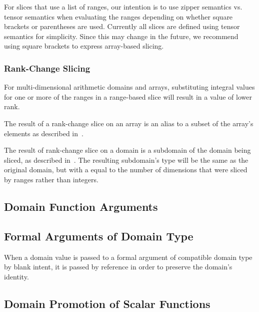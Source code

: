 \begin{openissue}
For slices that use a list of ranges, our intention is to use zipper
semantics vs. tensor semantics when evaluating the ranges depending on
whether square brackets or parentheses are used.  Currently all slices
are defined using tensor semantics for simplicity.  Since this may
change in the future, we recommend using square brackets to express
array-based slicing.
\end{openissue}

\subsubsection{Rank-Change Slicing}
\label{Rank_Change_Slicing}

For multi-dimensional arithmetic domains and arrays, substituting
integral values for one or more of the ranges in a range-based slice
will result in a value of lower rank.  

The result of a rank-change slice on an array is an alias to a subset
of the array's elements as described in~.

The result of rank-change slice on a domain is a subdomain of the
domain being sliced, as described in~.  The resulting
subdomain's type will be the same as the original domain, but with
a  equal to the number of dimensions that were sliced by
ranges rather than integers.


\subsection{Domain Function Arguments}
\label{Domain_Function Arguments}

\subsection{Formal Arguments of Domain Type}

When a domain value is passed to a formal argument of compatible
domain type by blank intent, it is passed by reference in order to
preserve the domain's identity.



\subsection{Domain Promotion of Scalar Functions}
\label{Domain_Promotion_of_Scalar_Functions}

